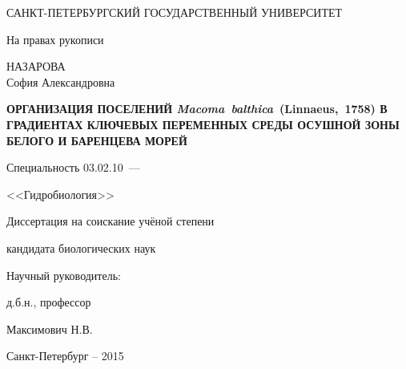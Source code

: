 \thispagestyle{empty}

\begin{center}
САНКТ-ПЕТЕРБУРГСКИЙ ГОСУДАРСТВЕННЫЙ УНИВЕРСИТЕТ\par
\par
\end{center}

\vspace{20mm}
\begin{flushright}
На правах рукописи

\end{flushright}

\vspace{30mm}
\begin{center}
{\large НАЗАРОВА\\ София Александровна}
\end{center}

\vspace{5mm}
\begin{center}
{\bfseries \large ОРГАНИЗАЦИЯ ПОСЕЛЕНИЙ {\itshape Macoma~balthica}~(Linnaeus,~1758) В ГРАДИЕНТАХ КЛЮЧЕВЫХ ПЕРЕМЕННЫХ СРЕДЫ ОСУШНОЙ ЗОНЫ БЕЛОГО И БАРЕНЦЕВА МОРЕЙ
\par}

\vspace{10mm}
{%
Специальность 03.02.10~---

<<Гидробиология>>
}

\vspace{10mm}
Диссертация на соискание учёной степени

кандидата биологических наук
\end{center}

\vspace{20mm}
\begin{flushright}
Научный руководитель:

д.б.н., профессор

Максимович Н.В.

\end{flushright}

\vspace{20mm}
\begin{center}
{Санкт-Петербург  -- 2015}
\end{center}

\newpage
